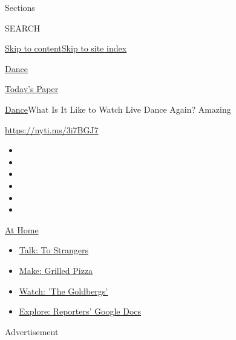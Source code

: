 Sections

SEARCH

\protect\hyperlink{site-content}{Skip to
content}\protect\hyperlink{site-index}{Skip to site index}

\href{https://www.nytimes.com/section/arts/dance}{Dance}

\href{https://myaccount.nytimes.com/auth/login?response_type=cookie\&client_id=vi}{}

\href{https://www.nytimes.com/section/todayspaper}{Today's Paper}

\href{/section/arts/dance}{Dance}\textbar{}What Is It Like to Watch Live
Dance Again? Amazing

\url{https://nyti.ms/3i7BGJ7}

\begin{itemize}
\item
\item
\item
\item
\item
\item
\end{itemize}

\href{https://www.nytimes.com/spotlight/at-home?action=click\&pgtype=Article\&state=default\&region=TOP_BANNER\&context=at_home_menu}{At
Home}

\begin{itemize}
\tightlist
\item
  \href{https://www.nytimes.com/2020/08/03/well/family/the-benefits-of-talking-to-strangers.html?action=click\&pgtype=Article\&state=default\&region=TOP_BANNER\&context=at_home_menu}{Talk:
  To Strangers}
\item
  \href{https://www.nytimes.com/2020/08/01/at-home/coronavirus-make-pizza-on-a-grill.html?action=click\&pgtype=Article\&state=default\&region=TOP_BANNER\&context=at_home_menu}{Make:
  Grilled Pizza}
\item
  \href{https://www.nytimes.com/2020/07/31/arts/television/goldbergs-abc-stream.html?action=click\&pgtype=Article\&state=default\&region=TOP_BANNER\&context=at_home_menu}{Watch:
  'The Goldbergs'}
\item
  \href{https://www.nytimes.com/interactive/2020/at-home/even-more-reporters-editors-diaries-lists-recommendations.html?action=click\&pgtype=Article\&state=default\&region=TOP_BANNER\&context=at_home_menu}{Explore:
  Reporters' Google Docs}
\end{itemize}

Advertisement

